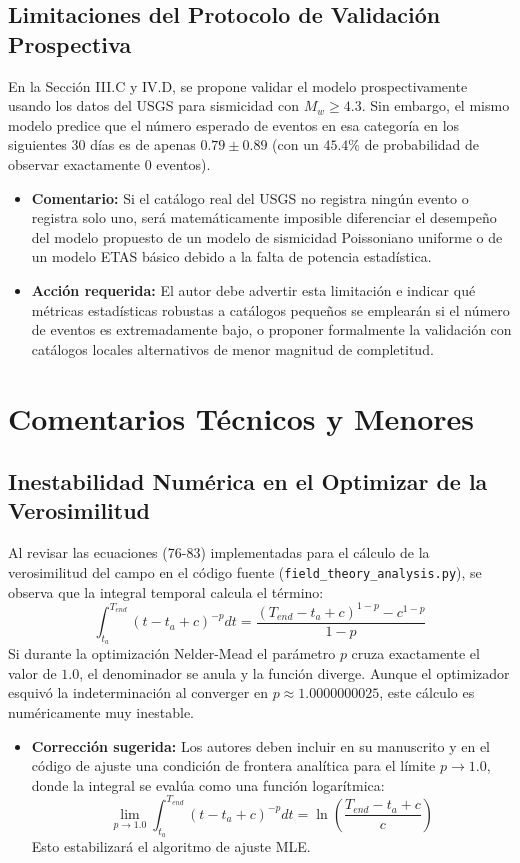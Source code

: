 \documentclass[11pt]{article}
\begin{document}
\subsection{Limitaciones del Protocolo de Validación Prospectiva}
En la Sección III.C y IV.D, se propone validar el modelo prospectivamente usando los datos del USGS para sismicidad con $M_w \ge 4.3$. Sin embargo, el mismo modelo predice que el número esperado de eventos en esa categoría en los siguientes 30 días es de apenas $0.79 \pm 0.89$ (con un $45.4\%$ de probabilidad de observar exactamente 0 eventos).
\begin{itemize}
    \item \textbf{Comentario:} Si el catálogo real del USGS no registra ningún evento o registra solo uno, será matemáticamente imposible diferenciar el desempeño del modelo propuesto de un modelo de sismicidad Poissoniano uniforme o de un modelo ETAS básico debido a la falta de potencia estadística.
    \item \textbf{Acción requerida:} El autor debe advertir esta limitación e indicar qué métricas estadísticas robustas a catálogos pequeños se emplearán si el número de eventos es extremadamente bajo, o proponer formalmente la validación con catálogos locales alternativos de menor magnitud de completitud.
\end{itemize}

\section{Comentarios Técnicos y Menores}

\subsection{Inestabilidad Numérica en el Optimizar de la Verosimilitud}
Al revisar las ecuaciones (76-83) implementadas para el cálculo de la verosimilitud del campo en el código fuente (\texttt{field\_theory\_analysis.py}), se observa que la integral temporal calcula el término:
\begin{equation}
\int_{t_a}^{T_{end}} (t - t_a + c)^{-p} dt = \frac{(T_{end} - t_a + c)^{1-p} - c^{1-p}}{1-p}
\end{equation}
Si durante la optimización Nelder-Mead el parámetro $p$ cruza exactamente el valor de $1.0$, el denominador se anula y la función diverge. Aunque el optimizador esquivó la indeterminación al converger en $p \approx 1.0000000025$, este cálculo es numéricamente muy inestable.
\begin{itemize}
    \item \textbf{Corrección sugerida:} Los autores deben incluir en su manuscrito y en el código de ajuste una condición de frontera analítica para el límite $p \to 1.0$, donde la integral se evalúa como una función logarítmica:
    \begin{equation}
    \lim_{p\to 1.0} \int_{t_a}^{T_{end}} (t - t_a + c)^{-p} dt = \ln\left(\frac{T_{end} - t_a + c}{c}\right)
    \end{equation}
    Esto estabilizará el algoritmo de ajuste MLE.
\end{itemize}
\end{document}
